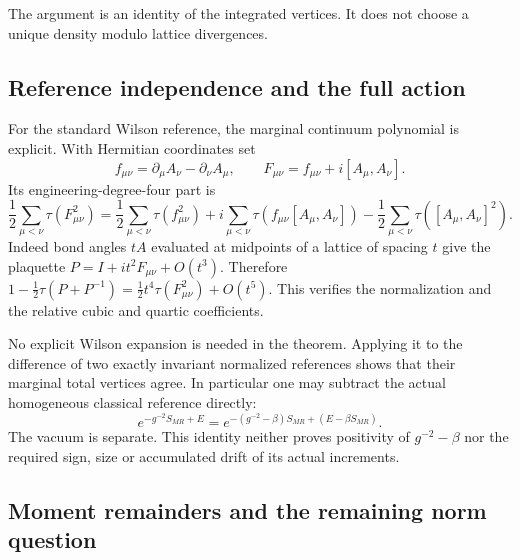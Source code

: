 The argument is an identity of the integrated vertices.
It does not choose a unique density modulo lattice divergences.

\subsection{Reference independence and the full action}
\label{tkw-full-action-section}

For the standard Wilson reference, the marginal continuum
polynomial is explicit. With Hermitian coordinates set
\[
 f_{\mu\nu}=\partial_\mu A_\nu-\partial_\nu A_\mu,
 \qquad F_{\mu\nu}=f_{\mu\nu}+i[A_\mu,A_\nu].
\]
Its engineering-degree-four part is
\begin{equation}
 \frac12\sum_{\mu<\nu}\tau(F_{\mu\nu}^2)
 =\frac12\sum_{\mu<\nu}\tau(f_{\mu\nu}^2)
   +i\sum_{\mu<\nu}\tau(f_{\mu\nu}[A_\mu,A_\nu])
   -\frac12\sum_{\mu<\nu}\tau([A_\mu,A_\nu]^2).
 \label{tkw-Wilson-polynomial}
\end{equation}
Indeed bond angles \(tA\) evaluated at midpoints of a
lattice of spacing \(t\) give the plaquette
\(P=I+it^2F_{\mu\nu}+O(t^3)\). Therefore
\(1-\frac12\tau(P+P^{-1})
 =\frac12t^4\tau(F_{\mu\nu}^2)+O(t^5)\).
This verifies the normalization and the relative cubic
and quartic coefficients.

No explicit Wilson expansion is needed in the theorem.
Applying it to the difference of two exactly invariant
normalized references shows that their marginal total
vertices agree. In particular one may subtract the actual
homogeneous classical reference directly:
\begin{equation}
 e^{-g^{-2}S_{MR}+E}
  =e^{-(g^{-2}-\beta)S_{MR}+(E-\beta S_{MR})}.
 \label{tkw-coupling-rebase}
\end{equation}
The vacuum is separate. This identity neither proves
positivity of \(g^{-2}-\beta\) nor the required sign,
size or accumulated drift of its actual increments.

\subsection{Moment remainders and the remaining norm question}
\label{tkw-scope-section}

